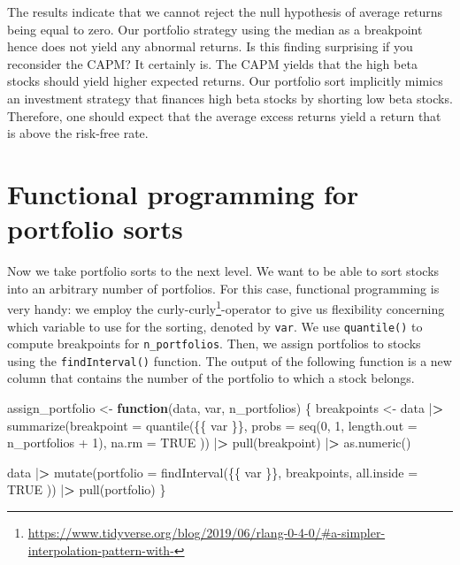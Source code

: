 \documentclass[
]{book}
\newenvironment{Shaded}{\begin{snugshade}}{\end{snugshade}}
\newcommand{\AttributeTok}[1]{\textcolor[rgb]{0.61,0.61,0.61}{#1}}
\newcommand{\ConstantTok}[1]{\textcolor[rgb]{0,0,0}{#1}}
\newcommand{\ControlFlowTok}[1]{\textcolor[rgb]{0.27,0.27,0.27}{\textbf{#1}}}
\newcommand{\DecValTok}[1]{\textcolor[rgb]{0.06,0.06,0.06}{#1}}
\newcommand{\ErrorTok}[1]{\textcolor[rgb]{0.14,0.14,0.14}{\textbf{#1}}}
\newcommand{\FunctionTok}[1]{\textcolor[rgb]{0,0,0}{#1}}
\newcommand{\NormalTok}[1]{#1}
\newcommand{\OtherTok}[1]{\textcolor[rgb]{0.37,0.37,0.37}{#1}}
\newcommand{\SpecialCharTok}[1]{\textcolor[rgb]{0,0,0}{#1}}
\renewcommand{\href}[2]{#2\footnote{\url{#1}}}
\begin{document}
The results indicate that we cannot reject the null hypothesis of average returns being equal to zero. Our portfolio strategy using the median as a breakpoint hence does not yield any abnormal returns. Is this finding surprising if you reconsider the CAPM? It certainly is. The CAPM yields that the high beta stocks should yield higher expected returns. Our portfolio sort implicitly mimics an investment strategy that finances high beta stocks by shorting low beta stocks. Therefore, one should expect that the average excess returns yield a return that is above the risk-free rate.

\hypertarget{functional-programming-for-portfolio-sorts}{%
\section{Functional programming for portfolio sorts}\label{functional-programming-for-portfolio-sorts}}

Now we take portfolio sorts to the next level. We want to be able to sort stocks into an arbitrary number of portfolios. For this case, functional programming is very handy: we employ the \href{https://www.tidyverse.org/blog/2019/06/rlang-0-4-0/\#a-simpler-interpolation-pattern-with-}{curly-curly}-operator to give us flexibility concerning which variable to use for the sorting, denoted by \texttt{var}. We use \texttt{quantile()} to compute breakpoints for \texttt{n\_portfolios}. Then, we assign portfolios to stocks using the \texttt{findInterval()} function. The output of the following function is a new column that contains the number of the portfolio to which a stock belongs.

\begin{Shaded}
\begin{Highlighting}[]
\NormalTok{assign\_portfolio }\OtherTok{\textless{}{-}} \ControlFlowTok{function}\NormalTok{(data, var, n\_portfolios) \{}
\NormalTok{  breakpoints }\OtherTok{\textless{}{-}}\NormalTok{ data }\SpecialCharTok{|}\ErrorTok{\textgreater{}}
    \FunctionTok{summarize}\NormalTok{(}\AttributeTok{breakpoint =} \FunctionTok{quantile}\NormalTok{(\{\{ var \}\},}
      \AttributeTok{probs =} \FunctionTok{seq}\NormalTok{(}\DecValTok{0}\NormalTok{, }\DecValTok{1}\NormalTok{, }\AttributeTok{length.out =}\NormalTok{ n\_portfolios }\SpecialCharTok{+} \DecValTok{1}\NormalTok{),}
      \AttributeTok{na.rm =} \ConstantTok{TRUE}
\NormalTok{    )) }\SpecialCharTok{|}\ErrorTok{\textgreater{}}
    \FunctionTok{pull}\NormalTok{(breakpoint) }\SpecialCharTok{|}\ErrorTok{\textgreater{}}
    \FunctionTok{as.numeric}\NormalTok{()}

\NormalTok{  data }\SpecialCharTok{|}\ErrorTok{\textgreater{}}
    \FunctionTok{mutate}\NormalTok{(}\AttributeTok{portfolio =} \FunctionTok{findInterval}\NormalTok{(\{\{ var \}\},}
\NormalTok{      breakpoints,}
      \AttributeTok{all.inside =} \ConstantTok{TRUE}
\NormalTok{    )) }\SpecialCharTok{|}\ErrorTok{\textgreater{}}
    \FunctionTok{pull}\NormalTok{(portfolio)}
\NormalTok{\}}
\end{Highlighting}
\end{Shaded}
\end{document}
